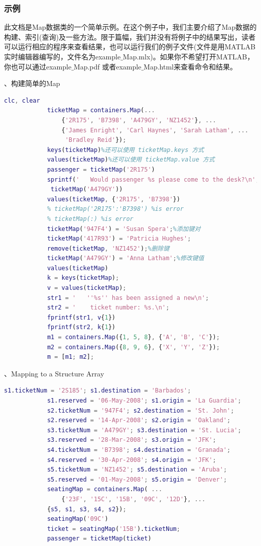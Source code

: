         \subsubsection{示例}
            此文档是Map数据类的一个简单示例。在这个例子中，我们主要介绍了Map数据的构建、索引(查询)及一些方法。限于篇幅，我们并没有将例子中的结果写出，读者可以运行相应的程序来查看结果，也可以运行我们的例子文件(文件是用MATLAB实时编辑器编写的，文件名为example${\_}$Map.mlx)。如果你不希望打开MATLAB，你也可以通过example${\_}$Map.pdf 或者example${\_}$Map.html来查看命令和结果。
            \par
            、构建简单的Map
            \begin{lstlisting}[language=Matlab]
            clc, clear
            ticketMap = containers.Map(...
                {'2R175', 'B7398', 'A479GY', 'NZ1452'}, ...
                {'James Enright', 'Carl Haynes', 'Sarah Latham', ...
                 'Bradley Reid'});
            keys(ticketMap)%还可以使用 ticketMap.keys 方式
            values(ticketMap)%还可以使用 ticketMap.value 方式
            passenger = ticketMap('2R175')
            sprintf('   Would passenger %s please come to the desk?\n', ...
             ticketMap('A479GY'))
            values(ticketMap, {'2R175', 'B7398'})
            % ticketMap('2R175':'B7398') %is error
            % ticketMap(:) %is error
            ticketMap('947F4') = 'Susan Spera';%添加键对
            ticketMap('417R93') = 'Patricia Hughes';
            remove(ticketMap, 'NZ1452');%删除键
            ticketMap('A479GY') = 'Anna Latham';%修改键值
            values(ticketMap)
            k = keys(ticketMap);
            v = values(ticketMap);
            str1 = '   ''%s'' has been assigned a new\n';
            str2 = '    ticket number: %s.\n';
            fprintf(str1, v{1})
            fprintf(str2, k{1})
            m1 = containers.Map({1, 5, 8}, {'A', 'B', 'C'});
            m2 = containers.Map({8, 9, 6}, {'X', 'Y', 'Z'});
            m = [m1; m2];
            \end{lstlisting}
            \par
            、Mapping to a Structure Array
            \begin{lstlisting}[language=Matlab]
            s1.ticketNum = '2S185'; s1.destination = 'Barbados';
            s1.reserved = '06-May-2008'; s1.origin = 'La Guardia';
            s2.ticketNum = '947F4'; s2.destination = 'St. John';
            s2.reserved = '14-Apr-2008'; s2.origin = 'Oakland';
            s3.ticketNum = 'A479GY'; s3.destination = 'St. Lucia';
            s3.reserved = '28-Mar-2008'; s3.origin = 'JFK';
            s4.ticketNum = 'B7398'; s4.destination = 'Granada';
            s4.reserved = '30-Apr-2008'; s4.origin = 'JFK';
            s5.ticketNum = 'NZ1452'; s5.destination = 'Aruba';
            s5.reserved = '01-May-2008'; s5.origin = 'Denver';
            seatingMap = containers.Map( ...
                {'23F', '15C', '15B', '09C', '12D'}, ...
            {s5, s1, s3, s4, s2});
            seatingMap('09C')
            ticket = seatingMap('15B').ticketNum;
            passenger = ticketMap(ticket)
            \end{lstlisting}
